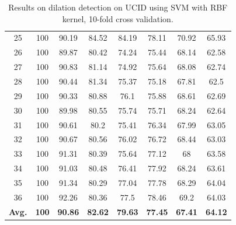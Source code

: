 \documentclass{ieeeaccess}
\begin{document}
\begin{table}[ht!]
\begin{minipage}{0.4\linewidth}
{\begin{tabular}{c|ccccccc}
				25&100&90.19&84.52&84.19&78.11&70.92&65.93\\
				26&100&89.87&80.42&74.24&75.44&68.14&62.58\\
				27&100&90.83&81.14&74.92&75.64&68.08&62.74\\
				28&100&90.44&81.34&75.37&75.18&67.81&62.5\\
				29&100&90.33&80.88&76.1&75.88&68.61&62.69\\
				30&100&89.98&80.55&75.74&75.71&68.24&62.64\\
				31&100&90.61&80.2&75.41&76.34&67.99&63.05\\
				32&100&90.67&80.56&76.02&76.72&68.44&63.03\\
				33&100&91.31&80.39&75.64&77.12&68&63.58\\
				34&100&91.03&80.48&76.41&77.92&68.24&63.61\\
				35&100&91.34&80.29&77.04&77.78&68.29&64.04\\
				36&100&92.26&80.36&77.5&78.46&69.2&64.03\\
				\hline
				\textbf{Avg.}&\textbf{100}&\textbf{90.86}&\textbf{82.62}&\textbf{79.63}&\textbf{77.45}&\textbf{67.41}&\textbf{64.12}\\
				\hline\hline	
		\end{tabular}}
	\end{minipage}
	\begin{minipage}{0.4\linewidth}
		\centering
		\caption{Results on dilation detection on UCID using SVM with RBF kernel, 10-fold cross validation.}
		\label{table:uciddilation}
\end{minipage}
\end{table}
\end{document}
